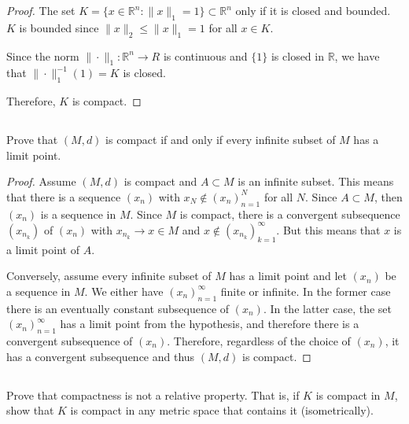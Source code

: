 \begin{proof}
The set $K = \{x \in \mathbb{R}^n :  \|x\|_1 = 1\} \subset \mathbb{R}^n$ only if it is closed and bounded. $K$ is bounded since $\|x\|_2 \leq \|x\|_1 = 1$ for all $x \in K$. 

Since the norm $\|\cdot\|_1: \mathbb{R}^n \rightarrow R$ is continuous and $\{1\}$ is closed in $\mathbb{R}$, we have that $\|\cdot\|_1^{-1}(1) = K$ is closed.

Therefore, $K$ is compact.
\end{proof}


\subsection{} Prove that $(M, d)$ is compact if and only if every infinite subset of $M$ has a limit point. 

\begin{proof}
Assume $(M,d)$ is compact and $A \subset M$ is an infinite subset. This means that there is a sequence $(x_n)$ with $x_N \notin (x_n)_{n=1}^N$ for all $N$. Since $A \subset M$, then $(x_n)$ is a sequence in $M$. Since $M$ is compact, there is a convergent subsequence $(x_{n_k})$ of $(x_n)$ with $x_{n_k} \rightarrow x \in M$ and $x \notin (x_{n_k})_{k=1}^\infty$. But this means that $x$ is a limit point of $A$.

\vspace{1em}

Conversely, assume every infinite subset of $M$ has a limit point and let $(x_n)$ be a sequence in $M$. We either have $(x_n)_{n=1}^\infty$ finite or infinite. In the former case there is an eventually constant subsequence of $(x_n)$. In the latter case, the set $(x_n)_{n=1}^\infty$ has a limit point from the hypothesis, and therefore there is a convergent subsequence of $(x_n)$. Therefore, regardless of the choice of $(x_n)$, it has a convergent subsequence and thus $(M,d)$ is compact.


\end{proof}


\subsection{}  Prove that compactness is not a relative property. That is, if $K$ is compact in $M$, show that $K$ is compact in any metric space that contains it (isometrically).

